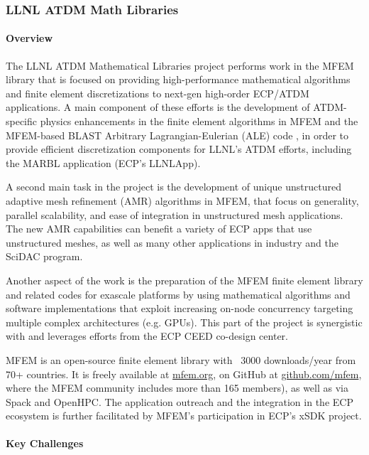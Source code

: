 \subsubsection{ LLNL ATDM Math Libraries}

\paragraph{Overview}

The LLNL ATDM Mathematical Libraries project performs work in the MFEM library
\cite{MFEM} that is focused on providing high-performance mathematical algorithms
and finite element discretizations to next-gen high-order ECP/ATDM
applications. A main component of these efforts is the development of
ATDM-specific physics enhancements in the finite element algorithms in MFEM and
the MFEM-based BLAST Arbitrary Lagrangian-Eulerian (ALE) code \cite{BLAST}, in
order to provide efficient discretization components for LLNL's ATDM efforts,
including the MARBL application (ECP's LLNLApp).

A second main task in the project is the development of unique unstructured
adaptive mesh refinement (AMR) algorithms in MFEM, that focus on generality,
parallel scalability, and ease of integration in unstructured mesh
applications. The new AMR capabilities can benefit a variety of ECP apps that
use unstructured meshes, as well as many other applications in industry and the
SciDAC program.

Another aspect of the work is the preparation of the MFEM finite element library
and related codes for exascale platforms by using mathematical algorithms and
software implementations that exploit increasing on-node concurrency targeting
multiple complex architectures (e.g. GPUs). This part of the project is
synergistic with and leverages efforts from the ECP CEED co-design center.

MFEM is an open-source finite element library with ~3000 downloads/year from 70+
countries. It is freely available at \url{mfem.org}, on GitHub
at \url{github.com/mfem}, where the MFEM community includes more than 165
members), as well as via Spack and OpenHPC. The application outreach and the
integration in the ECP ecosystem is further facilitated by MFEM's participation
in ECP's xSDK project.

\paragraph{Key Challenges}

